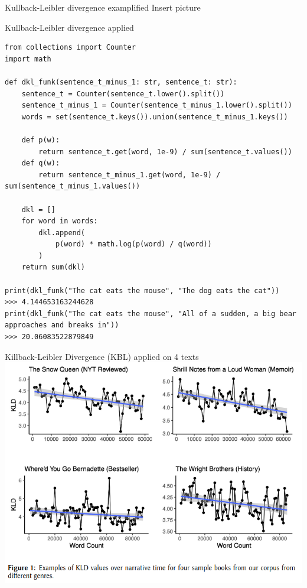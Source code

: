 \documentclass[aspectratio=169]{beamer}
\begin{document}
\begin{frame}[fragile]{Kullback-Leibler divergence examplified}
Insert picture
\end{frame}

\begin{frame}[fragile]{Kullback-Leibler divergence applied}

\begin{verbatim}
from collections import Counter
import math

def dkl_funk(sentence_t_minus_1: str, sentence_t: str):
    sentence_t = Counter(sentence_t.lower().split())
    sentence_t_minus_1 = Counter(sentence_t_minus_1.lower().split())
    words = set(sentence_t.keys()).union(sentence_t_minus_1.keys())
    
    def p(w):
        return sentence_t.get(word, 1e-9) / sum(sentence_t.values())
    def q(w):
        return sentence_t_minus_1.get(word, 1e-9) / sum(sentence_t_minus_1.values())
        
    dkl = []    
    for word in words:
        dkl.append(
            p(word) * math.log(p(word) / q(word))
        )
    return sum(dkl)

print(dkl_funk("The cat eats the mouse", "The dog eats the cat"))
>>> 4.144653163244628
print(dkl_funk("The cat eats the mouse", "All of a sudden, a big bear approaches and breaks in"))
>>> 20.06083522879849
\end{verbatim}
\end{frame}

\begin{frame}{Killback-Leibler Divergence (KBL) applied on 4 texts}
    \centering
    \includegraphics[width=.60\linewidth]{intro-to-ch/images/entrop_examples.png}
\end{frame}
\end{document}

